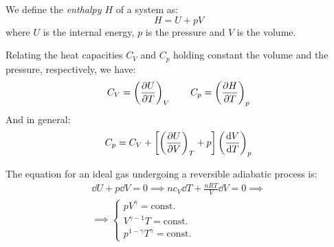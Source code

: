 \documentclass[../../../main.tex]{subfiles}
\begin{document}
\begin{multicols}{2}
\begin{definition}
  \end{definition}
  \begin{definition}[Enthalpy]
    We define the \textit{enthalpy $H$} of a system as: $$H=U+pV$$
    where $U$ is the internal energy, $p$ is the pressure and $V$ is the volume.
  \end{definition}
  \begin{prop}
    Relating the heat capacities $C_V$ and $C_p$ holding constant the volume and the pressure, respectively, we have:
    $$C_V=\left(\pdv{U}{T}\right)_V\qquad C_p=\left(\pdv{H}{T}\right)_p$$
    And in general:
    $$C_p=C_V+\left[\left(\pdv{U}{V}\right)_T+p\right]\left(\dv{V}{T}\right)_p$$
  \end{prop}
  \begin{prop}
    The equation for an ideal gas undergoing a reversible adiabatic process is:
    \begin{multline*}
      \dd U+p\dd V=0\implies nc_V\dd T+\frac{nRT}{V}\dd V=0\implies\\\implies\left\{
      \begin{array}{c}
        pV^\gamma=\text{const.}      \\
        V^{\gamma-1} T=\text{const.} \\
        p^{1-\gamma}T^\gamma=\text{const.}
      \end{array}\right.
    \end{multline*}
  \end{prop}

\end{multicols}
\end{document}
